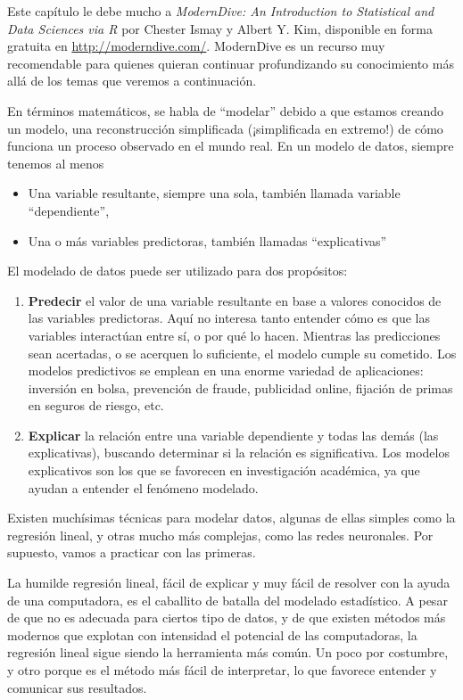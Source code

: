 \documentclass[spanish,]{book}
\providecommand{\tightlist}{%
  \setlength{\itemsep}{0pt}\setlength{\parskip}{0pt}}
\begin{document}
Este capítulo le debe mucho a \emph{ModernDive: An Introduction to Statistical and Data Sciences via R} por Chester Ismay y Albert Y. Kim, disponible en forma gratuita en \url{http://moderndive.com/}. ModernDive es un recurso muy recomendable para quienes quieran continuar profundizando su conocimiento más allá de los temas que veremos a continuación.

En términos matemáticos, se habla de ``modelar'' debido a que estamos creando un modelo, una reconstrucción simplificada (¡simplificada en extremo!) de cómo funciona un proceso observado en el mundo real. En un modelo de datos, siempre tenemos al menos

\begin{itemize}
\tightlist
\item
  Una variable resultante, siempre una sola, también llamada variable ``dependiente'',
\item
  Una o más variables predictoras, también llamadas ``explicativas''
\end{itemize}

El modelado de datos puede ser utilizado para dos propósitos:

\begin{enumerate}
\def\labelenumi{\arabic{enumi}.}
\item
  \textbf{Predecir} el valor de una variable resultante en base a valores conocidos de las variables predictoras. Aquí no interesa tanto entender cómo es que las variables interactúan entre sí, o por qué lo hacen. Mientras las predicciones sean acertadas, o se acerquen lo suficiente, el modelo cumple su cometido. Los modelos predictivos se emplean en una enorme variedad de aplicaciones: inversión en bolsa, prevención de fraude, publicidad online, fijación de primas en seguros de riesgo, etc.
\item
  \textbf{Explicar} la relación entre una variable dependiente y todas las demás (las explicativas), buscando determinar si la relación es significativa. Los modelos explicativos son los que se favorecen en investigación académica, ya que ayudan a entender el fenómeno modelado.
\end{enumerate}

Existen muchísimas técnicas para modelar datos, algunas de ellas simples como la regresión lineal, y otras mucho más complejas, como las redes neuronales. Por supuesto, vamos a practicar con las primeras.

La humilde regresión lineal, fácil de explicar y muy fácil de resolver con la ayuda de una computadora, es el caballito de batalla del modelado estadístico. A pesar de que no es adecuada para ciertos tipo de datos, y de que existen métodos más modernos que explotan con intensidad el potencial de las computadoras, la regresión lineal sigue siendo la herramienta más común. Un poco por costumbre, y otro porque es el método más fácil de interpretar, lo que favorece entender y comunicar sus resultados.
\end{document}
